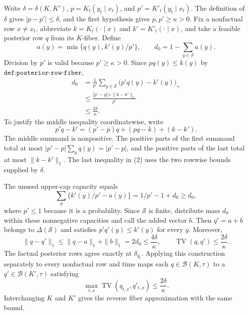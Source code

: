 Write \(\delta=\delta(K,K')\), \(p=K_t(y_t\mid x_t)\), and \(p'=K'_t(y_t\mid x_t)\).  The definition of \(\delta\) gives \(|p-p'|\le\delta\), and the first hypothesis gives \(p,p'\ge\kappa>0\).  Fix a nonfactual row \(x\ne x_t\), abbreviate \(k=K_t(\cdot\mid x)\) and \(k'=K'_t(\cdot\mid x)\), and take a feasible posterior row \(q\) from its \(K\)-fiber.  Define
\[
 a(y)=\min\{q(y),k'(y)/p'\},
 \qquad
 d_0=1-\sum_{y\in\mathcal S}a(y).
\]
Division by \(p'\) is valid because \(p'\ge\kappa>0\).  Since \(pq(y)\le k(y)\) by \(\texttt{def:posterior-row-fiber}\),
\[
\begin{aligned}
 d_0
 &=\frac1{p'}\sum_{y\in\mathcal S}\bigl(p'q(y)-k'(y)\bigr)_+\\
 &\le \frac{|p'-p|+\|k-k'\|_1}{p'}\\
 &\le \frac{2\delta}{\kappa}.
\end{aligned}
\tag{2}
\]
To justify the middle inequality coordinatewise, write
\[
 p'q-k'=(p'-p)q+(pq-k)+(k-k').
\]
The middle summand is nonpositive.  The positive parts of the first summand total at most \(|p'-p|\sum_yq(y)=|p'-p|\), and the positive parts of the last total at most \(\|k-k'\|_1\).  The last inequality in (2) uses the two rowwise bounds supplied by \(\delta\).

The unused upper-cap capacity equals
\[
 \sum_y\{k'(y)/p'-a(y)\}
 =1/p'-1+d_0
 \ge d_0,
\]
where \(p'\le1\) because it is a probability.  Since \(\mathcal S\) is finite, distribute mass \(d_0\) within these nonnegative capacities and call the added vector \(b\).  Then \(q'=a+b\) belongs to \(\Delta(\mathcal S)\) and satisfies \(p'q'(y)\le k'(y)\) for every \(y\).  Moreover,
\[
 \|q-q'\|_1
 \le \|q-a\|_1+\|b\|_1
 =2d_0
 \le\frac{4\delta}{\kappa},
 \qquad
 \operatorname{TV}(q,q')\le\frac{2\delta}{\kappa}.
 \tag{3}
\]
The factual posterior rows agree exactly at \(\delta_{y_t}\).  Applying this construction separately to every nonfactual row and time maps each \(q\in\mathcal B(K,\tau)\) to a \(q'\in\mathcal B(K',\tau)\) satisfying
\[
 \max_{t,x}\operatorname{TV}(q_{t,x},q'_{t,x})
 \le\frac{2\delta}{\kappa}.
 \tag{4}
\]
Interchanging \(K\) and \(K'\) gives the reverse fiber approximation with the same bound.

